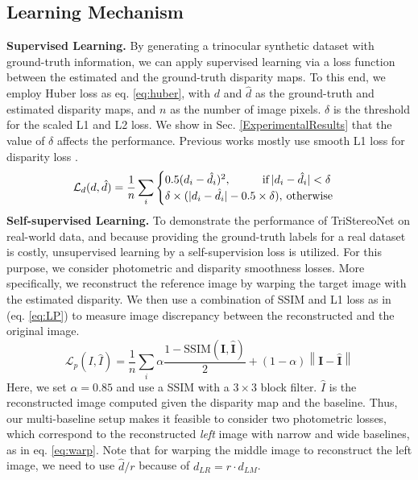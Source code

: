 \documentclass[10pt,twocolumn,letterpaper]{article}
\begin{document}
\subsection{Learning Mechanism}
\noindent\textbf{Supervised Learning.} By generating a trinocular synthetic dataset with ground-truth information, we can apply supervised learning via a loss function between the estimated and the ground-truth disparity maps. To this end, we employ Huber loss as eq. \ref{eq:huber}, with $d$ and $\hat d$ as the ground-truth and estimated disparity maps, and $n$ as the number of image pixels. $\delta$ is the threshold for the scaled L1 and L2 loss. We show in Sec. \ref{ExperimentalResults} that the value of $\delta$ affects the performance. Previous works mostly use smooth L1 loss for disparity loss \cite{chang2018pyramid,guo2019group,zhang2019ga,duggal2019deeppruner,shen2021cfnet}.
\begin{equation}
	\mathcal{L}_d(d,\hat{d}) =\frac{1}{n}\sum_{i}
	\begin{cases} 
		0.5(d_i-\hat{d_i})^2, \text{\hspace{2.8em}if\hspace{0.2em}} |d_i-\hat{d_i}|<\delta\\
		\delta\times(|d_i-\hat{d_i}|-0.5\times \delta), \text{\hspace{0.2em}otherwise} 
	\end{cases}
	\label{eq:huber}
\end{equation}
\noindent\textbf{Self-supervised Learning.} To demonstrate the performance of TriStereoNet on real-world data, and because providing the ground-truth labels for a real dataset is costly, unsupervised learning by a self-supervision loss is utilized. For this purpose, we consider photometric and disparity smoothness losses. More specifically, we reconstruct the reference image by warping the target image with the estimated disparity. We then use a combination of SSIM \cite{wang2004image} and L1 loss as in \cite{godard2017unsupervised} (eq. \ref{eq:LP}) to measure image discrepancy between the reconstructed and the original image.
\begin{equation}
	\mathcal{L}_{p}(I,\hat{I})=\frac{1}{n}\sum_{i} \alpha \frac{1-\text{SSIM}\left(\mathbf{I},  \hat{\mathbf{I}}\right)}{2}+(1-\alpha)\left\|\mathbf{I}-\hat{\mathbf{I}}\right\|
	\label{eq:LP}
\end{equation}
Here, we set $\alpha = 0.85$ and use a SSIM with a $3\times 3$ block filter. $\hat{I}$ is the reconstructed image computed given the disparity map and the baseline. Thus, our multi-baseline setup makes it feasible to consider two photometric losses, which correspond to the reconstructed \emph{left} image with narrow and wide baselines, as in eq. \ref{eq:warp}. Note that for warping the middle image to reconstruct the left image, we need to use $\hat{d}/r$ because of $d_{LR}=r\cdot d_{LM}$. 
\end{document}
